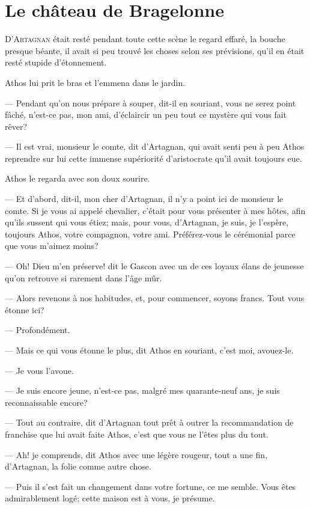 \chapter{Le château de Bragelonne}

\lettrine{D}{'Artagnan} était resté pendant toute cette scène le regard effaré, la bouche presque béante, il avait si peu trouvé les choses selon ses prévisions, qu'il en était resté stupide d'étonnement.

\zz
Athos lui prit le bras et l'emmena dans le jardin.

— Pendant qu'on nous prépare à souper, dit-il en souriant, vous ne serez point fâché, n'est-ce pas, mon ami, d'éclaircir un peu tout ce mystère qui vous fait rêver?

— Il est vrai, monsieur le comte, dit d'Artagnan, qui avait senti peu à peu Athos reprendre sur lui cette immense supériorité d'aristocrate qu'il avait toujours eue.

Athos le regarda avec son doux sourire.

— Et d'abord, dit-il, mon cher d'Artagnan, il n'y a point ici de monsieur le comte. Si je vous ai appelé chevalier, c'était pour vous présenter à mes hôtes, afin qu'ils sussent qui vous étiez; mais, pour vous, d'Artagnan, je suis, je l'espère, toujours Athos, votre compagnon, votre ami. Préférez-vous le cérémonial parce que vous m'aimez moins?

— Oh! Dieu m'en préserve! dit le Gascon avec un de ces loyaux élans de jeunesse qu'on retrouve si rarement dans l'âge mûr.

— Alors revenons à nos habitudes, et, pour commencer, soyons francs. Tout vous étonne ici?

— Profondément.

— Mais ce qui vous étonne le plus, dit Athos en souriant, c'est moi, avouez-le.

— Je vous l'avoue.

— Je suis encore jeune, n'est-ce pas, malgré mes quarante-neuf ans, je suis reconnaissable encore?

— Tout au contraire, dit d'Artagnan tout prêt à outrer la recommandation de franchise que lui avait faite Athos, c'est que vous ne l'êtes plus du tout.

— Ah! je comprends, dit Athos avec une légère rougeur, tout a une fin, d'Artagnan, la folie comme autre chose.

— Puis il s'est fait un changement dans votre fortune, ce me semble. Vous êtes admirablement logé; cette maison est à vous, je présume.

